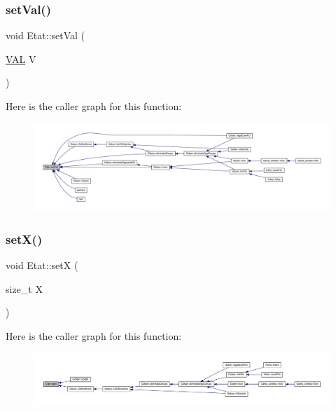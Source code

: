\mbox{\label{class_etat_aa88987ca54aee676717f05e4570c0aec}} 
\subsubsection{\texorpdfstring{set\+Val()}{setVal()}}
{\footnotesize\ttfamily void Etat\+::set\+Val (\begin{DoxyParamCaption}\item[{\hyperlink{class_etat_af3ddb2296ffc379b7f3ad2bf832f294e}{V\+AL}}]{V }\end{DoxyParamCaption})}

Here is the caller graph for this function\+:
\nopagebreak
\begin{figure}[H]
\begin{center}
\leavevmode
\includegraphics[width=350pt]{class_etat_aa88987ca54aee676717f05e4570c0aec_icgraph}
\end{center}
\end{figure}
\mbox{\label{class_etat_ac020c4fe222274ac849a03fc8f19a99a}} 
\subsubsection{\texorpdfstring{set\+X()}{setX()}}
{\footnotesize\ttfamily void Etat\+::setX (\begin{DoxyParamCaption}\item[{size\+\_\+t}]{X }\end{DoxyParamCaption})}

Here is the caller graph for this function\+:
\nopagebreak
\begin{figure}[H]
\begin{center}
\leavevmode
\includegraphics[width=350pt]{class_etat_ac020c4fe222274ac849a03fc8f19a99a_icgraph}
\end{center}
\end{figure}
\mbox{\label{class_etat_a8a54fc9ecb1b97d84d2f1f259e3bf70e}} 
